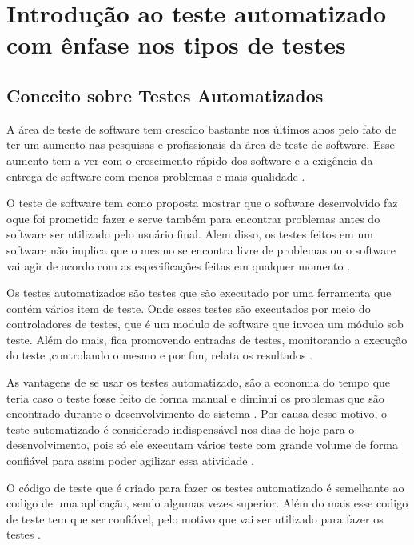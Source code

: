 \chapter{Introdução ao teste automatizado com ênfase nos tipos de testes}
\label{cap:Introdução ao teste automatizado com ênfase nos tipos de testes}

\section{Conceito sobre Testes Automatizados}
\label{sec:Conceito sobre Testes Automatizados}
	
	A área de teste de software tem crescido bastante nos últimos anos pelo fato de ter um aumento nas pesquisas e profissionais da área de teste de software. Esse aumento tem a ver com o crescimento rápido dos software e a exigência da entrega de software com menos problemas e mais qualidade \cite{LivroAutomatizacao}.
    
    O teste de software tem como proposta mostrar que o software desenvolvido faz oque foi prometido fazer e serve também para encontrar problemas antes do software ser utilizado pelo usuário final\cite{EngSofSommerville}. Alem disso, os testes feitos em um software não implica que o mesmo se encontra livre de problemas ou o software vai agir de acordo com as especificações feitas em qualquer momento \cite{EngSofSommerville}.
    
    Os testes automatizados são testes que são executado por uma ferramenta que contém vários item de teste. Onde esses testes são executados por meio do controladores de testes, que é um modulo de software que invoca um módulo sob teste. Além do mais, fica promovendo entradas de testes, monitorando a execução do teste ,controlando o mesmo e por fim, relata os resultados \cite{EngdeSoftwareFMP}.
    
    As vantagens de se usar os testes automatizado, são a economia do tempo que teria caso o teste fosse feito de forma manual e  diminui os problemas que são encontrado durante o desenvolvimento do sistema \cite{LivroAutomatizacao}. Por causa desse motivo, o teste automatizado é considerado indispensável nos dias de hoje para o desenvolvimento, pois só ele executam vários teste com grande volume de forma confiável para assim poder agilizar essa atividade \cite{EngdeSoftwareFMP}.  
    
    O código de teste que é criado para fazer os testes automatizado é semelhante ao codigo de uma aplicação, sendo algumas vezes superior. Além do mais esse codigo de teste tem que ser confiável, pelo motivo que vai ser utilizado para fazer os testes \cite{EngdeSoftwareFMP}. 
    
